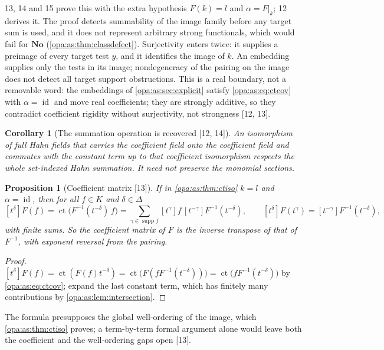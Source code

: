 \documentclass[11pt,oneside]{article}
\numberwithin{equation}{section}
\newtheorem{proposition}[proposition]{Proposition}
\newtheorem{corollary}[corollary]{Corollary}
\theoremstyle{definition}
\theoremstyle{remark}
\newcommand{\No}{\mathbf{No}}
\newcommand{\supp}{\operatorname{supp}}
\newcommand{\ct}{\operatorname{ct}}
\newcommand{\id}{\operatorname{id}}
\newcommand{\coef}[2]{[t^{#1}]#2}
\newcommand{\src}[1]{\textup{\textsf{\small[#1]}}}
\begin{document}
13, 14 and 15 prove this with the extra hypothesis $F(k)=l$ and $\alpha=F|_k$; 12 derives it. The
proof detects summability of the image family before any target sum is used, and it
does not represent arbitrary strong functionals, which would fail for $\No$
(\cref{opa:as:thm:classdefect}). Surjectivity enters twice: it supplies a preimage of every
target test $y$, and it identifies the image of $k$. An embedding supplies only the tests
in its image; nondegeneracy of the pairing on the image does not detect all target
support obstructions. This is a real boundary, not a removable word: the embeddings of
\cref{opa:as:sec:explicit} satisfy \eqref{opa:as:eq:ctcov} with $\alpha=\id$ and move real
coefficients; they are strongly additive, so they contradict coefficient rigidity without
surjectivity, not strongness \src{12, 13}.

\begin{corollary}[The summation operation is recovered \src{12, 14}]\label{opa:as:cor:recover}
An isomorphism of full Hahn fields that carries the coefficient field onto the coefficient
field and commutes with the constant term up to that coefficient isomorphism respects the
whole set-indexed Hahn summation. It need not preserve the monomial sections.
\end{corollary}

\begin{proposition}[Coefficient matrix \src{13}]\label{opa:as:prop:matrix}
If in \cref{opa:as:thm:ctiso} $k=l$ and $\alpha=\id$, then for all $f\in K$ and
$\delta\in\Delta$
\begin{equation}\label{opa:as:eq:matrix}
 \coef\delta{F(f)}=\ct\bigl(F^{-1}(t^{-\delta})\,f\bigr)
 =\sum_{\gamma\in\supp f}\coef\gamma f\,\coef{-\gamma}{F^{-1}(t^{-\delta})},
 \qquad
 \coef\delta{F(t^\gamma)}=\coef{-\gamma}{F^{-1}(t^{-\delta})},
\end{equation}
with finite sums. So the coefficient matrix of $F$ is the inverse transpose of that of
$F^{-1}$, with exponent reversal from the pairing.
\end{proposition}
\begin{proof}
$\coef\delta{F(f)}=\ct(F(f)t^{-\delta})=\ct\bigl(F(fF^{-1}(t^{-\delta}))\bigr)
=\ct\bigl(fF^{-1}(t^{-\delta})\bigr)$ by \eqref{opa:as:eq:ctcov}; expand the last constant
term, which has finitely many contributions by \cref{opa:as:lem:intersection}.
\end{proof}

The formula presupposes the global well-ordering of the image, which
\cref{opa:as:thm:ctiso} proves; a term-by-term formal argument alone would leave both the
coefficient and the well-ordering gaps open \src{13}.
\end{document}
